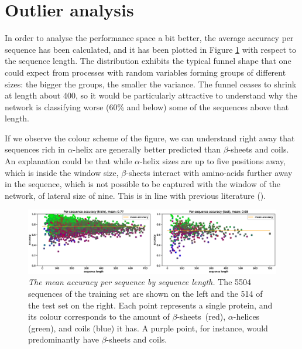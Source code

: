 \section{Outlier analysis} \label{sect:outliers}

In order to analyse the performance space a bit better, the average accuracy per sequence has been calculated, and it has been plotted in Figure \ref{fig:per_seq_acc} with respect to the sequence length. The distribution exhibits the typical funnel shape that one could expect from processes with random variables forming groups of different sizes: the bigger the groups, the smaller the variance. The funnel ceases to shrink at length about 400, so it would be particularly attractive to understand why the network is classifying worse (60\% and below) some of the sequences above that length.

If we observe the colour scheme of the figure, we can understand right away that sequences rich in $\alpha$-helix are generally better predicted than $\beta$-sheets and coils. An explanation could be that while $\alpha$-helix sizes are up to five positions away, which is inside the window size, $\beta$-sheets interact with amino-acids further away in the sequence, which is not possible to be captured with the window of the network, of lateral size of nine. This is in line with previous literature (\cite{Rost2001}).

\begin{figure}
	\centering
	\includegraphics[width=1\linewidth]{Figures/per_seq_acc}
	\caption{\textit{The mean accuracy per sequence by sequence length.} The 5504 sequences of the training set are shown on the left and the 514 of the test set on the right. Each point represents a single protein, and its colour corresponds to the amount of $\beta$-sheets~(red), $\alpha$-helices (green), and coils (blue) it has. A purple point, for instance, would predominantly have $\beta$-sheets and coils.}
	\label{fig:per_seq_acc}
\end{figure}

